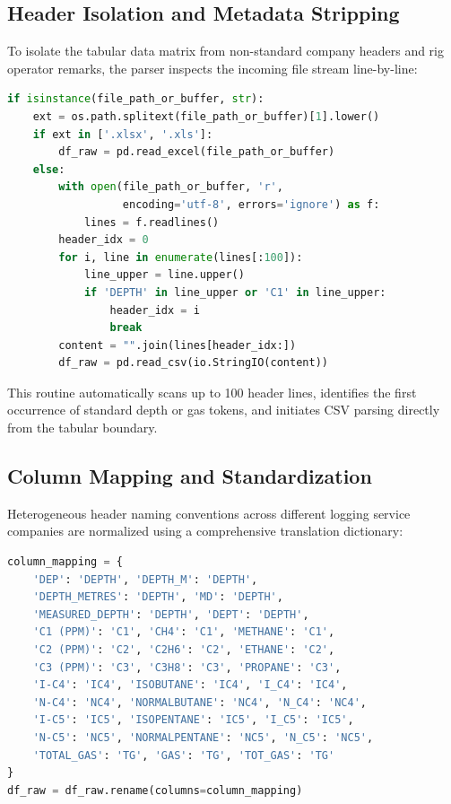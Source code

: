 \subsection{Header Isolation and Metadata Stripping}
To isolate the tabular data matrix from non-standard company headers and rig operator remarks, the parser inspects the incoming file stream line-by-line:
\begin{lstlisting}[language=Python, caption={Header isolation algorithm in \texttt{parser.py}}]
if isinstance(file_path_or_buffer, str):
    ext = os.path.splitext(file_path_or_buffer)[1].lower()
    if ext in ['.xlsx', '.xls']:
        df_raw = pd.read_excel(file_path_or_buffer)
    else:
        with open(file_path_or_buffer, 'r', 
                  encoding='utf-8', errors='ignore') as f:
            lines = f.readlines()
        header_idx = 0
        for i, line in enumerate(lines[:100]):
            line_upper = line.upper()
            if 'DEPTH' in line_upper or 'C1' in line_upper:
                header_idx = i
                break
        content = "".join(lines[header_idx:])
        df_raw = pd.read_csv(io.StringIO(content))
\end{lstlisting}
This routine automatically scans up to 100 header lines, identifies the first occurrence of standard depth or gas tokens, and initiates CSV parsing directly from the tabular boundary.

\subsection{Column Mapping and Standardization}
Heterogeneous header naming conventions across different logging service companies are normalized using a comprehensive translation dictionary:
\begin{lstlisting}[language=Python, caption={Column standardization mapping in \texttt{parser.py}}]
column_mapping = {
    'DEP': 'DEPTH', 'DEPTH_M': 'DEPTH', 
    'DEPTH_METRES': 'DEPTH', 'MD': 'DEPTH', 
    'MEASURED_DEPTH': 'DEPTH', 'DEPT': 'DEPTH',
    'C1 (PPM)': 'C1', 'CH4': 'C1', 'METHANE': 'C1',
    'C2 (PPM)': 'C2', 'C2H6': 'C2', 'ETHANE': 'C2',
    'C3 (PPM)': 'C3', 'C3H8': 'C3', 'PROPANE': 'C3',
    'I-C4': 'IC4', 'ISOBUTANE': 'IC4', 'I_C4': 'IC4',
    'N-C4': 'NC4', 'NORMALBUTANE': 'NC4', 'N_C4': 'NC4',
    'I-C5': 'IC5', 'ISOPENTANE': 'IC5', 'I_C5': 'IC5',
    'N-C5': 'NC5', 'NORMALPENTANE': 'NC5', 'N_C5': 'NC5',
    'TOTAL_GAS': 'TG', 'GAS': 'TG', 'TOT_GAS': 'TG'
}
df_raw = df_raw.rename(columns=column_mapping)
\end{lstlisting}


